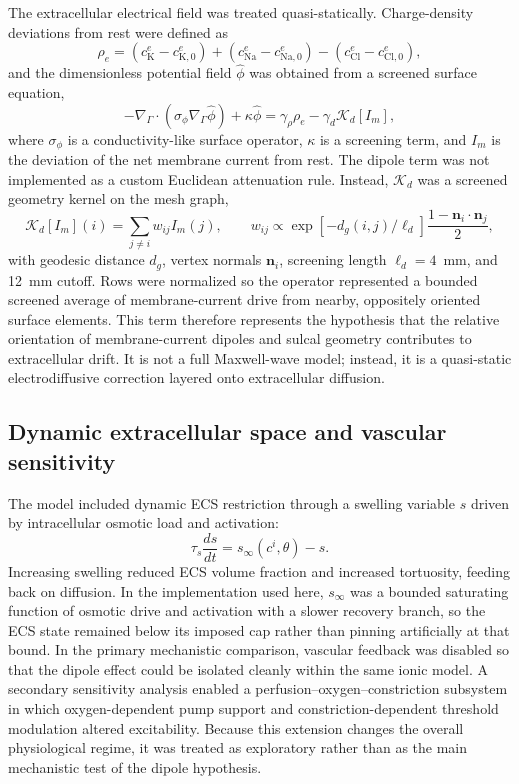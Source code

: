 \documentclass[12pt]{article}
\begin{document}
The extracellular electrical field was treated quasi-statically. Charge-density deviations from rest were defined as
\begin{equation}
\rho_e = (c_{\mathrm{K}}^{e}-c_{\mathrm{K},0}^{e}) + (c_{\mathrm{Na}}^{e}-c_{\mathrm{Na},0}^{e}) - (c_{\mathrm{Cl}}^{e}-c_{\mathrm{Cl},0}^{e}),
\end{equation}
and the dimensionless potential field $\hat{\phi}$ was obtained from a screened surface equation,
\begin{equation}
-\nabla_{\Gamma}\cdot(\sigma_{\phi}\nabla_{\Gamma}\hat{\phi}) + \kappa \hat{\phi}
= \gamma_{\rho}\rho_e - \gamma_{d}\mathcal{K}_{d}[I_m],
\end{equation}
where $\sigma_{\phi}$ is a conductivity-like surface operator, $\kappa$ is a screening term, and $I_m$ is the deviation of the net membrane current from rest. The dipole term was not implemented as a custom Euclidean attenuation rule. Instead, $\mathcal{K}_{d}$ was a screened geometry kernel on the mesh graph,
\begin{equation}
\mathcal{K}_{d}[I_m](i) = \sum_{j\neq i} w_{ij} I_m(j),
\qquad
w_{ij} \propto \exp\!\left[-d_g(i,j)/\ell_d\right] \frac{1-\mathbf{n}_i\cdot\mathbf{n}_j}{2},
\end{equation}
with geodesic distance $d_g$, vertex normals $\mathbf{n}_i$, screening length $\ell_d=4$~mm, and 12~mm cutoff. Rows were normalized so the operator represented a bounded screened average of membrane-current drive from nearby, oppositely oriented surface elements. This term therefore represents the hypothesis that the relative orientation of membrane-current dipoles and sulcal geometry contributes to extracellular drift. It is not a full Maxwell-wave model; instead, it is a quasi-static electrodiffusive correction layered onto extracellular diffusion.

\subsection{Dynamic extracellular space and vascular sensitivity}

The model included dynamic ECS restriction through a swelling variable $s$ driven by intracellular osmotic load and activation:
\begin{equation}
\tau_{s}\frac{ds}{dt} = s_{\infty}(c^i,\theta) - s.
\end{equation}
Increasing swelling reduced ECS volume fraction and increased tortuosity, feeding back on diffusion. In the implementation used here, $s_{\infty}$ was a bounded saturating function of osmotic drive and activation with a slower recovery branch, so the ECS state remained below its imposed cap rather than pinning artificially at that bound. In the primary mechanistic comparison, vascular feedback was disabled so that the dipole effect could be isolated cleanly within the same ionic model. A secondary sensitivity analysis enabled a perfusion--oxygen--constriction subsystem in which oxygen-dependent pump support and constriction-dependent threshold modulation altered excitability. Because this extension changes the overall physiological regime, it was treated as exploratory rather than as the main mechanistic test of the dipole hypothesis.
\end{document}
